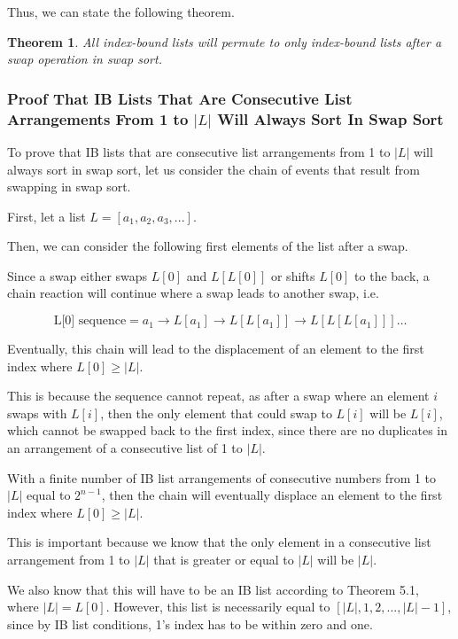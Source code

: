 \documentclass[12pt]{article}
\newtheorem{theorem}{Theorem}[section]
\begin{document}
Thus, we can state the following theorem.

\begin{theorem}
 All index-bound lists will permute to only index-bound lists after a swap operation in swap sort.
\end{theorem}

\subsubsection{Proof That IB Lists That Are Consecutive List Arrangements From 1 to $|L|$ Will Always Sort In Swap Sort}

To prove that IB lists that are consecutive list arrangements from 1 to $|L|$ will always sort in swap sort, let us consider the chain of events that result from swapping in swap sort.

First, let a list $L = [a_1,a_2,a_3,...]$.

Then, we can consider the following first elements of the list after a swap.

Since a swap either swaps $L[0]$ and $L[L[0]]$ or shifts $L[0]$ to the back, a chain reaction will continue where a swap leads to another swap, i.e.

\[
\text{L[0] sequence} = a_1 \rightarrow L[a_1] \rightarrow L[L[a_1]] \rightarrow L[L[L[a_1]]] \dots
\]

Eventually, this chain will lead to the displacement of an element to the first index where $L[0] \geq |L|$.

This is because the sequence cannot repeat, as after a swap where an element $i$ swaps with $L[i]$, then the only element that could swap to $L[i]$ will be $L[i]$, which cannot be swapped back to the first index, since there are no duplicates in an arrangement of a consecutive list of 1 to $|L|$.

With a finite number of IB list arrangements of consecutive numbers from 1 to $|L|$ equal to $2^{n-1}$, then the chain will eventually displace an element to the first index where $L[0] \geq |L|$.

This is important because we know that the only element in a consecutive list arrangement from 1 to $|L|$ that is greater or equal to $|L|$ will be $|L|$.

We also know that this will have to be an IB list according to Theorem 5.1, where $|L|=L[0]$. However, this list is necessarily equal to $[|L|, 1, 2, ..., |L|-1]$, since by IB list conditions, 1's index has to be within zero and one.
\end{document}
